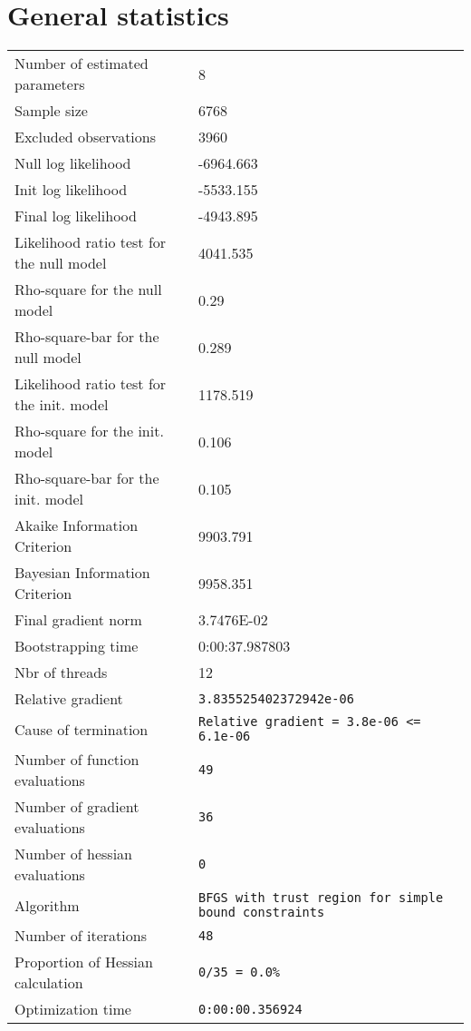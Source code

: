 \section{General statistics}
\begin{tabular}{ll}
Number of estimated parameters & 8 \\
Sample size & 6768 \\
Excluded observations & 3960 \\
Null log likelihood & -6964.663 \\
Init log likelihood & -5533.155 \\
Final log likelihood & -4943.895 \\
Likelihood ratio test for the null model & 4041.535 \\
Rho-square for the null model & 0.29 \\
Rho-square-bar for the null model & 0.289 \\
Likelihood ratio test for the init. model & 1178.519 \\
Rho-square for the init. model & 0.106 \\
Rho-square-bar for the init. model & 0.105 \\
Akaike Information Criterion & 9903.791 \\
Bayesian Information Criterion & 9958.351 \\
Final gradient norm & 3.7476E-02 \\
Bootstrapping time & 0:00:37.987803 \\
Nbr of threads & 12 \\
Relative gradient & \verb$3.835525402372942e-06$ \\
Cause of termination & \verb$Relative gradient = 3.8e-06 <= 6.1e-06$ \\
Number of function evaluations & \verb$49$ \\
Number of gradient evaluations & \verb$36$ \\
Number of hessian evaluations & \verb$0$ \\
Algorithm & \verb$BFGS with trust region for simple bound constraints$ \\
Number of iterations & \verb$48$ \\
Proportion of Hessian calculation & \verb$0/35 = 0.0%$ \\
Optimization time & \verb$0:00:00.356924$ \\
\end{tabular}

